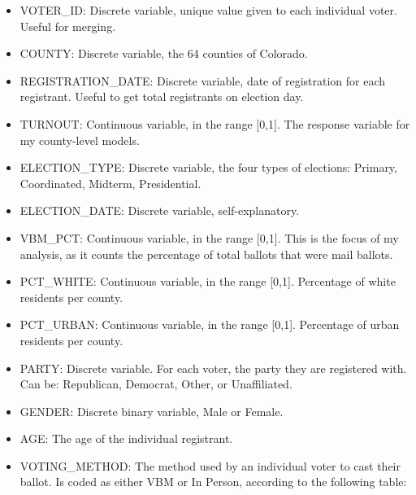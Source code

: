 \documentclass[12pt,twoside]{reedthesis}
\providecommand{\tightlist}{%
  \setlength{\itemsep}{0pt}\setlength{\parskip}{0pt}}
\begin{document}
  \begin{itemize}
  \tightlist
  \item
    VOTER\_ID: Discrete variable, unique value given to each individual
    voter. Useful for merging.
  \item
    COUNTY: Discrete variable, the 64 counties of Colorado.
  \item
    REGISTRATION\_DATE: Discrete variable, date of registration for each
    registrant. Useful to get total registrants on election day.
  \item
    TURNOUT: Continuous variable, in the range {[}0,1{]}. The response
    variable for my county-level models.
  \item
    ELECTION\_TYPE: Discrete variable, the four types of elections:
    Primary, Coordinated, Midterm, Presidential.
  \item
    ELECTION\_DATE: Discrete variable, self-explanatory.
  \item
    VBM\_PCT: Continuous variable, in the range {[}0,1{]}. This is the
    focus of my analysis, as it counts the percentage of total ballots
    that were mail ballots.
  \item
    PCT\_WHITE: Continuous variable, in the range {[}0,1{]}. Percentage of
    white residents per county.
  \item
    PCT\_URBAN: Continuous variable, in the range {[}0,1{]}. Percentage of
    urban residents per county.
  \item
    PARTY: Discrete variable. For each voter, the party they are
    registered with. Can be: Republican, Democrat, Other, or Unaffiliated.
  \item
    GENDER: Discrete binary variable, Male or Female.
  \item
    AGE: The age of the individual registrant.
  \item
    VOTING\_METHOD: The method used by an individual voter to cast their
    ballot. Is coded as either VBM or In Person, according to the
    following table:
  \end{itemize}
  
\end{document}
